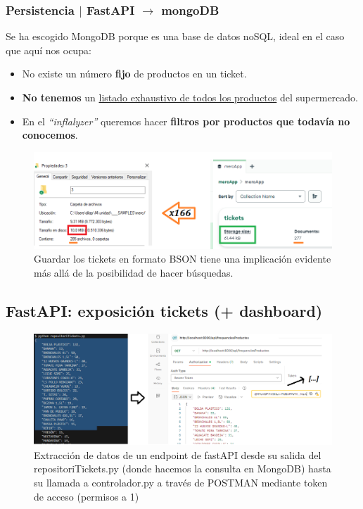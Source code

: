 \documentclass{beamer}
\begin{document}
	\begin{frame}
		\frametitle{Persistencia $|$ FastAPI $\rightarrow$ mongoDB}
		Se ha escogido MongoDB porque es una base de datos noSQL, ideal en el caso que aquí nos ocupa:
		\begin{itemize}
			\item No existe un número \textbf{fijo} de productos en un ticket.
			\item \textbf{No tenemos} un \underline{listado exhaustivo de todos los productos} del supermercado.
			\item En el \textit{``inflalyzer''} queremos hacer \textbf{filtros por productos que todavía no conocemos}.
		\end{itemize}
	\end{frame}
	
	
	\begin{frame}
		\begin{figure}
			\centering
			\includegraphics[width=1\linewidth]{imgEspecifiques/disminucioTamanyMongoDB}
			\caption{Guardar los tickets en formato BSON tiene una implicación evidente más allá de la posibilidad de hacer búsquedas.}
			\label{fig:disminuciotamanymongodb}
		\end{figure}
		
	\end{frame}
	
	
		\subsection{FastAPI: exposición tickets (+ dashboard)}
	
		\begin{frame}
			
			\begin{figure}
				\centering
				\includegraphics[width=1\linewidth]{imgEspecifiques/dashboardA}
				\caption{Extracción de datos de un endpoint de fastAPI desde su salida del repositoriTickets.py (donde hacemos la consulta en MongoDB) hasta su llamada a controlador.py a través de POSTMAN mediante token de acceso (permisos a 1)}
				\label{fig:dashboardA}
			\end{figure}
			
		\end{frame}
	
\end{document}
